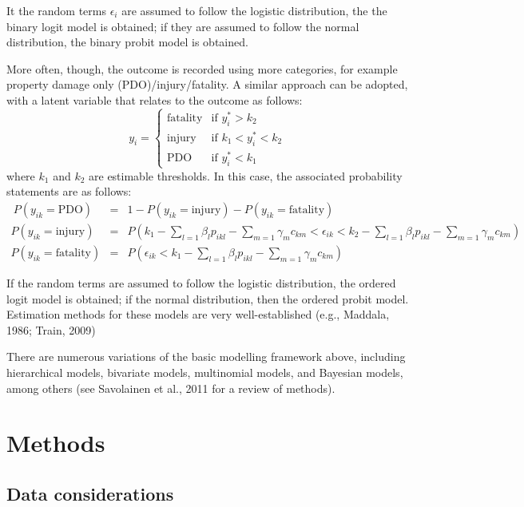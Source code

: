 \documentclass[]{elsarticle} %
\begin{document}
It the random terms \(\epsilon_i\) are assumed to follow the logistic
distribution, the the binary logit model is obtained; if they are
assumed to follow the normal distribution, the binary probit model is
obtained.

More often, though, the outcome is recorded using more categories, for
example property damage only (PDO)/injury/fatality. A similar approach
can be adopted, with a latent variable that relates to the outcome as
follows: \[
y_i = 
\begin{cases}
\text{fatality} & \text{if } y_i^*> k_2\\
\text{injury} & \text{if } k_1< y_i^*<k_2\\
\text{PDO} & \text{if } y_i^*<k_1
\end{cases}
\] where \(k_1\) and \(k_2\) are estimable thresholds. In this case, the
associated probability statements are as follows: \[
\begin{array}{rcl}\
P(y_{ik} = \text{PDO}) &=& 1 - P(y_{ik} = \text{injury}) - P(y_{ik} = \text{fatality})\\ 
P(y_{ik} = \text{injury}) &=& P(k_1 - \sum_{l=1}\beta_lp_{ikl} - \sum_{m=1}\gamma_mc_{km} < \epsilon_{ik} < k_2 - \sum_{l=1}\beta_lp_{ikl} - \sum_{m=1}\gamma_mc_{km} )\\
P(y_{ik} = \text{fatality}) &=& P(\epsilon_{ik} < k_1 - \sum_{l=1}\beta_lp_{ikl} - \sum_{m=1}\gamma_mc_{km} )
\end{array}
\]

If the random terms are assumed to follow the logistic distribution, the
ordered logit model is obtained; if the normal distribution, then the
ordered probit model. Estimation methods for these models are very
well-established (e.g., Maddala, 1986; Train, 2009)

There are numerous variations of the basic modelling framework above,
including hierarchical models, bivariate models, multinomial models, and
Bayesian models, among others (see Savolainen et al., 2011 for a review
of methods).

\hypertarget{sec:methods}{%
\section{Methods}\label{sec:methods}}

\hypertarget{data-considerations}{%
\subsection{Data considerations}\label{data-considerations}}
\end{document}
